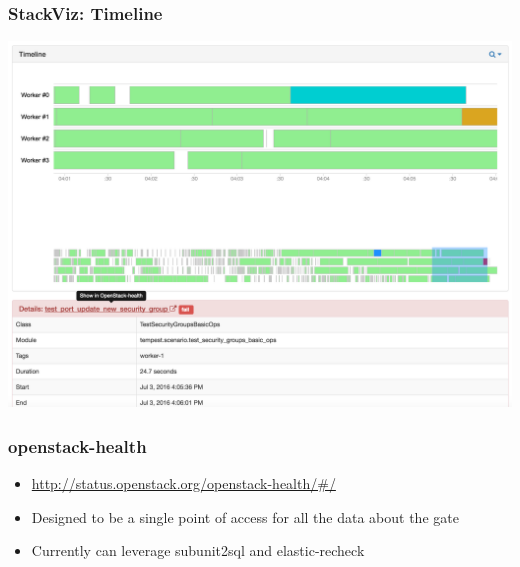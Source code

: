 \documentclass[aspectratio=169,11pt,hyperref={colorlinks=true}]{beamer}
\begin{document}
\begin{frame}
  \frametitle{StackViz: Timeline}
  \begin{center}
  \includegraphics[width=1.1\textheight]{stackviz-sample-timeline.png}
  \end{center}
\end{frame}


\begin{frame}
    \frametitle{openstack-health}
    \begin{itemize}
        \item \href{http://status.openstack.org/openstack-health/\#/}{http://status.openstack.org/openstack-health/\#/}
        \item Designed to be a single point of access for all the data about the gate
        \item Currently can leverage subunit2sql and elastic-recheck
    \end{itemize}
\end{frame}
\end{document}
